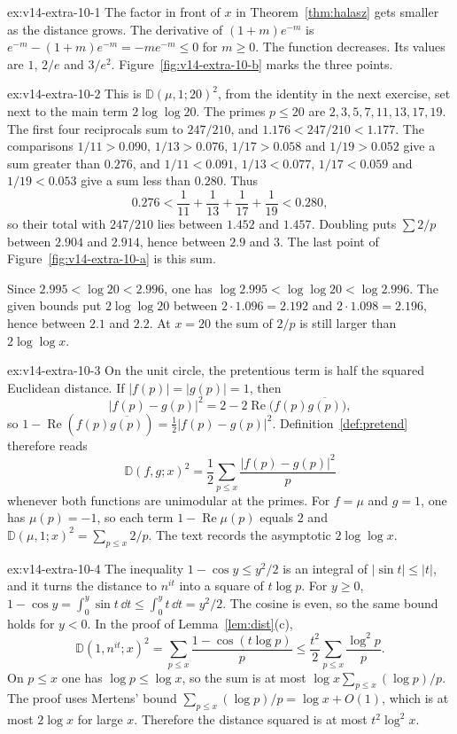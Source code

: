 \begin{solution}{ex:v14-extra-10-1}
\idea The factor in front of $x$ in Theorem~\ref{thm:halasz} gets smaller as the distance grows.
\writeup The derivative of $(1+m)e^{-m}$ is $e^{-m}-(1+m)e^{-m}=-me^{-m}\le0$ for $m\ge0$. The function decreases. Its values are $1$, $2/e$ and $3/e^2$. Figure~\ref{fig:v14-extra-10-b} marks the three points.
\end{solution}

\begin{solution}{ex:v14-extra-10-2}
\idea This is $\mathbb D(\mu,1;20)^2$, from the identity in the next exercise, set next to the main term $2\log\log20$.
\writeup The primes $p\le20$ are $2,3,5,7,11,13,17,19$. The first four reciprocals sum to $247/210$, and $1.176<247/210<1.177$. The comparisons $1/11>0.090$, $1/13>0.076$, $1/17>0.058$ and $1/19>0.052$ give a sum greater than $0.276$, and $1/11<0.091$, $1/13<0.077$, $1/17<0.059$ and $1/19<0.053$ give a sum less than $0.280$. Thus
\[
0.276<\frac1{11}+\frac1{13}+\frac1{17}+\frac1{19}<0.280,
\]
so their total with $247/210$ lies between $1.452$ and $1.457$. Doubling puts $\sum 2/p$ between $2.904$ and $2.914$, hence between $2.9$ and $3$. The last point of Figure~\ref{fig:v14-extra-10-a} is this sum.

Since $2.995<\log20<2.996$, one has $\log2.995<\log\log20<\log2.996$. The given bounds put $2\log\log20$ between $2\cdot1.096=2.192$ and $2\cdot1.098=2.196$, hence between $2.1$ and $2.2$. At $x=20$ the sum of $2/p$ is still larger than $2\log\log x$.
\end{solution}

\begin{solution}{ex:v14-extra-10-3}
\idea On the unit circle, the pretentious term is half the squared Euclidean distance.
\writeup If $|f(p)|=|g(p)|=1$, then
\[
|f(p)-g(p)|^2=2-2\operatorname{Re}\bigl(f(p)\overline{g(p)}\bigr),
\]
so $1-\operatorname{Re}(f(p)\overline{g(p)})=\frac12|f(p)-g(p)|^2$. Definition~\ref{def:pretend} therefore reads
\[
\mathbb D(f,g;x)^2=\frac12\sum_{p\le x}\frac{|f(p)-g(p)|^2}p
\]
whenever both functions are unimodular at the primes. For $f=\mu$ and $g=1$, one has $\mu(p)=-1$, so each term $1-\operatorname{Re}\mu(p)$ equals $2$ and $\mathbb D(\mu,1;x)^2=\sum_{p\le x}2/p$. The text records the asymptotic $2\log\log x$.
\end{solution}

\begin{solution}{ex:v14-extra-10-4}
\idea The inequality $1-\cos y\le y^2/2$ is an integral of $|\sin t|\le|t|$, and it turns the distance to $n^{it}$ into a square of $t\log p$.
\writeup For $y\ge0$, $1-\cos y=\int_0^y\sin t\,\dd t\le\int_0^y t\,\dd t=y^2/2$. The cosine is even, so the same bound holds for $y<0$. In the proof of Lemma~\ref{lem:dist}(c),
\[
\mathbb D(1,n^{it};x)^2=\sum_{p\le x}\frac{1-\cos(t\log p)}p\le\frac{t^2}2\sum_{p\le x}\frac{\log^2 p}p.
\]
On $p\le x$ one has $\log p\le\log x$, so the sum is at most $\log x\sum_{p\le x}(\log p)/p$. The proof uses Mertens' bound $\sum_{p\le x}(\log p)/p=\log x+O(1)$, which is at most $2\log x$ for large $x$. Therefore the distance squared is at most $t^2\log^2 x$.
\end{solution}

